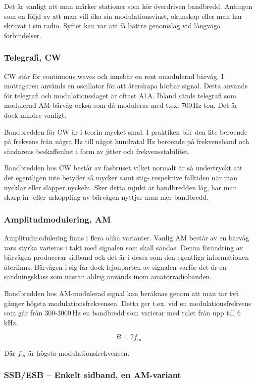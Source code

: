 Det är vanligt att man märker stationer som kör överdriven bandbredd. Antingen som en följd av att man vill öka sin modulationsvinst, okunskap eller man har skruvat i sin radio. Syftet kan var att få bättre genomslag vid långväga förbindelser.

\subsubsection{Telegrafi, CW}

CW står för continuous waves och innebär en rent omodulerad bärvåg. I mottagaren används en oscillator för att återskapa hörbar signal. Detta används för telegrafi och modulationsslaget är oftast A1A. Ibland sänds telegrafi som modulerad AM-bärvåg också som då moduleras med t.ex. 700\,Hz ton. Det är dock mindre vanligt.

Bandbredden för CW är i teorin mycket smal. I praktiken blir den lite beroende på frekvens från några Hz till något hundratal Hz beroende på frekvensband och sändarens beskaffenhet i form av jitter och frekvensstabilitet.

Bandbredden hos CW består av fasbruset vilket normalt är så undertryckt att det egentligen inte betyder så mycker samt stig- respektive falltiden när man nycklar eller släpper nyckeln. Sker detta mjukt är bandbredden låg, har man skarp in- eller urkoppling av bärvågen nyttjar man mer bandbredd.

\subsubsection{Amplitudmodulering, AM}

Amplitudmodulering finns i flera olika varianter. Vanlig AM består av en bärvåg vars styrka varieras i takt med signalen som skall sändas. Denna förändring av bärvågen producerar sidband och det är i dessa som den egentliga informationen återfinns. Bärvågen i sig får dock lejonparten av signalen varför det är en sändningsklass som nästan aldrig används inom amatörradiobanden.

Bandbredden hos AM-modulerad signal kan beräknas genom att man tar två gånger högsta modulationsfrekvensen. Detta ger t.ex. vid en modulationsfrekvens som går från 300-3000\,Hz en bandbredd som varierar med talet från upp till 6\,kHz.

$$B=2f_m$$

Där $f_m$ är högsta modulationsfrekvensen.

\subsubsection{SSB/ESB -- Enkelt sidband, en AM-variant}

